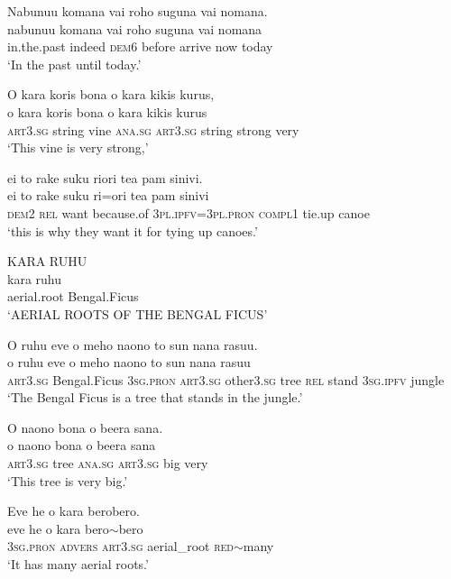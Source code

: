 \ea\label{ex:text7-77}
Nabunuu komana vai roho suguna vai nomana.\\
\gll nabunuu	komana	vai	roho	suguna	vai	nomana\\
     in.the.past	indeed	\textsc{dem}6	before	arrive	now	today\\
\glt `In the past until today.'
\z

\ea\label{ex:text7-78}
O kara koris bona o kara kikis kurus,\\
\gll o	kara	koris	bona	o	kara	kikis	kurus\\
     \textsc{art}3.\textsc{sg}	string	vine	\textsc{ana}.\textsc{sg}	\textsc{art}3.\textsc{sg}	string	strong	very\\
\glt `This vine is very strong,'
\z

\ea\label{ex:text7-79}
ei to rake suku riori tea pam sinivi.\\
\gll ei	to	rake	suku	ri=ori	tea	pam	sinivi\\
     \textsc{dem}2	\textsc{rel}	want	because.of	3\textsc{pl}.\textsc{ipfv}=3\textsc{pl}.\textsc{pron}	\textsc{compl}1	tie.up	canoe\\
\glt `this is why they want it for tying up canoes.'
\z

\ea\label{ex:text7-80}
KARA RUHU\\
\gll kara	ruhu\\
     aerial.root	Bengal.Ficus\\
\glt `AERIAL ROOTS OF THE BENGAL FICUS'
\z

\ea\label{ex:text7-81}
O ruhu eve o meho naono to sun nana rasuu.\\
\gll o	ruhu	eve	o	meho	naono	to	sun	nana	rasuu\\
     \textsc{art}3.\textsc{sg}	Bengal.Ficus	3\textsc{sg}.\textsc{pron}	\textsc{art}3.\textsc{sg}	other3.\textsc{sg}	tree	\textsc{rel}	stand	3\textsc{sg}.\textsc{ipfv}	jungle\\
\glt `The Bengal Ficus is a tree that stands in the jungle.'
\z

\ea\label{ex:text7-82}
O naono bona o beera sana.\\
\gll o	naono	bona	o	beera	sana\\
     \textsc{art}3.\textsc{sg}	tree	\textsc{ana}.\textsc{sg}	\textsc{art}3.\textsc{sg}	big	very\\
\glt `This tree is very big.'
\z

\ea\label{ex:text7-83}
Eve he o kara berobero.\\
\gll eve	he	o	kara	bero{$\sim$}bero\\
     3\textsc{sg}.\textsc{pron}	\textsc{advers}	\textsc{art}3.\textsc{sg}	aerial\_root	\textsc{red}{$\sim$}many\\
\glt `It has many aerial roots.'
\z

